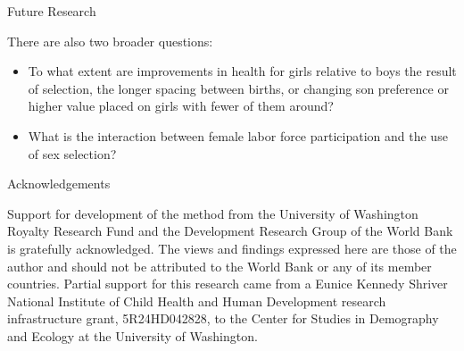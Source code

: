 \documentclass[final]{beamer}
\newlength{\onecolwid}
\begin{document}
\begin{frame}{}
\begin{columns}[t]
\begin{column}{\onecolwid}
\begin{block}{Future Research}
\bigskip

There are also two broader questions:
\begin{itemize}
\item To what extent are improvements in health for girls
relative to boys the result of selection, the longer spacing between
births, or changing son preference or higher value placed on girls
with fewer of them around?
\item What is the interaction between female labor force participation
and the use of sex selection?
\end{itemize}

\end{block}

\begin{block}{Acknowledgements}

Support for development of the method from the University of Washington Royalty 
Research Fund and the Development Research Group of the World Bank is gratefully 
acknowledged.
The views and findings expressed here are those of the author and
should not be attributed to the World Bank or any of its member countries.
Partial support for this research came from a Eunice Kennedy Shriver National
Institute of Child Health and Human Development research infrastructure grant,
5R24HD042828, to the Center for Studies in Demography and Ecology at the
University of Washington.

\end{block}



\end{column}


\end{columns}

\end{frame}
\end{document}
